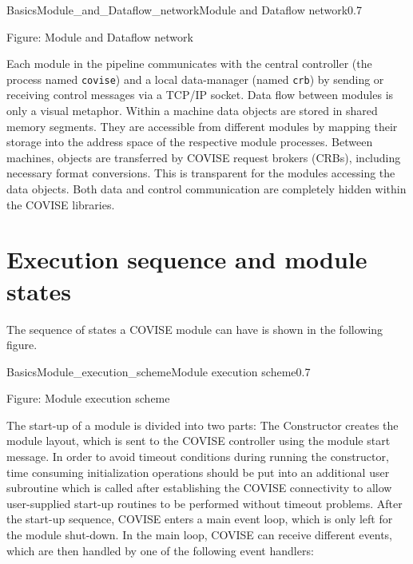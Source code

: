 \begin{covimg}{Basics}{Module_and_Dataflow_network}{Module and Dataflow network}{0.7}\
\end{covimg}
\begin{htmlonly}
Figure: Module and Dataflow network
\vspace*{1cm}
\end{htmlonly}

Each module in the pipeline communicates with the central controller
(the process named \texttt{covise}) and a local 
data-manager (named \texttt{crb}) by sending or receiving control messages via a TCP/IP socket. 
Data flow between modules is only a visual metaphor. Within a machine data objects are 
stored in shared memory segments. They are accessible from different modules by mapping
their storage into the address space of the respective module processes. Between 
machines, objects are transferred by COVISE request brokers (CRBs), including necessary 
format conversions. This is transparent for the modules accessing the data objects. 
Both data and control communication are completely hidden within the
COVISE libraries.

\section{Execution sequence and module states}
\latexonly
\index{Execution sequence} 
\endlatexonly

The sequence of states a COVISE module can have is shown in the following figure.

\begin{covimg}{Basics}{Module_execution_scheme}{Module execution scheme}{0.7}\
\end{covimg}
\begin{htmlonly}
Figure: Module execution scheme
\vspace*{1cm}
\end{htmlonly}

The start-up of a module  is divided into two parts: The Constructor creates the module 
layout, which is sent to the COVISE controller using the module start message.
In order to avoid timeout conditions during running the constructor,
time consuming initialization operations should be put into an additional user subroutine
which is called after establishing the COVISE connectivity to allow user-supplied start-up routines to 
be performed without timeout problems. After the start-up sequence, COVISE enters a 
main event loop, which is only left for the module shut-down. In the main loop, COVISE 
can receive different events, which are then handled by one of the following event 
handlers:


